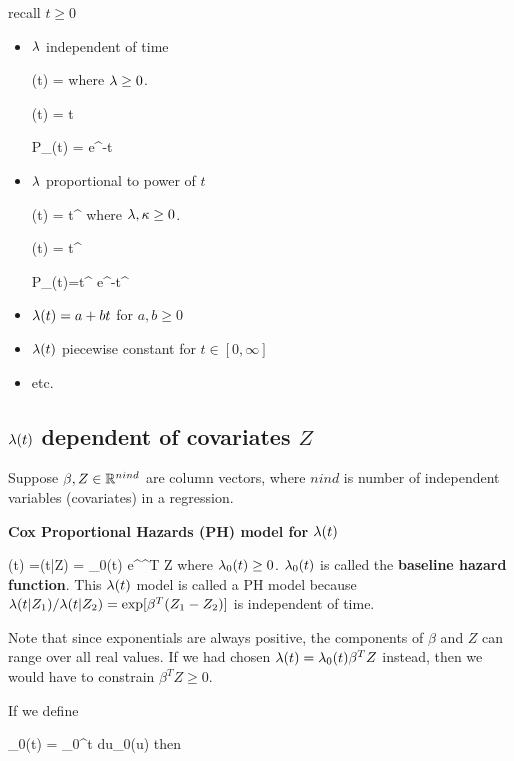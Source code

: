 recall $t\geq 0$
\begin{itemize}
\item $\lambda$ independent of time

\beq
\lam(t) = \lambda
\eeq
where $\lambda \geq 0$.

\beq
\Lambda(t) = \lam t
\eeq

\beq
P_\rvtau(t) = \lam e^{-\lam t}
\quad{}
\eeq

\item  $\lambda$ proportional to power of $t$

\beq
\lam(t) = \kappa\lam t^{}
\eeq
where $\lambda, \kappa\geq 0$.

\beq
\Lambda(t) = \lam t^\kappa
\eeq

\beq
P_\rvtau(t)=\kappa\lam t^{} e^{-\lam t^\kappa}
\quad {}
\eeq

\item $\lambda(t)= a + bt$ for $a,b\geq 0$

\item $\lambda(t)$ piecewise constant for $t\in [0, \infty]$


\item etc.

\end{itemize}


\subsection{$\lambda(t)$  dependent
of covariates $Z$}

Suppose $\beta, Z\in { \mathbb{R}}^{nind}$ are
column vectors, where $nind$ is
number of independent variables (covariates)
in a regression.

{\bf Cox Proportional Hazards (PH) model for
$\lambda(t)$}

\beq
\lam(t) =\lam(t|Z) = \lam_0(t) e^{\beta^T Z}
\eeq
where $\lambda_0(t)\geq 0$.
$\lambda_0(t)$
is called the {\bf baseline
hazard function}.
This $\lambda(t)$  model is called a
PH model because
$\lambda(t|Z_1)/\lambda(t|Z_2)=
\exp[\beta^T(Z_1-Z_2)]$
is independent of time.

Note that since exponentials
are always positive, the components
of $\beta$ and $Z$ can
range over all real values.
If we had chosen
$\lambda(t) = \lambda_0(t)\beta^T Z$
instead, then we would have
to constrain $\beta^TZ\geq 0$.

If we define

\beq
\Lambda_0(t) = \int_0^t du\;\lam_0(u)
\eeq
then

